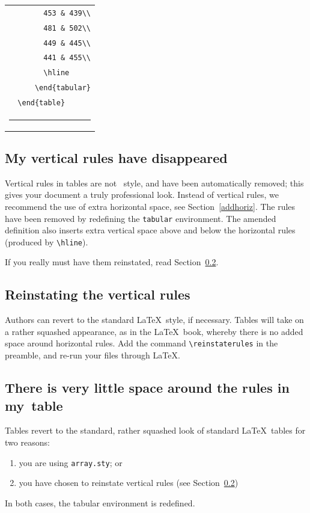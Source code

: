 \begin{table}
\begin{tabular}{@{}p{0pt}@{}}
      \verb"        453 & 439\\"\\
      \verb"        481 & 502\\"\\
      \verb"        449 & 445\\"\\
      \verb"        441 & 455\\"\\
      \verb"        \hline"\\
      \verb"      \end{tabular}"\\
      \verb"  \end{table}"\\
      \rule[2pt]{\textwidth}{0.5pt}\\
    \end{tabular}
  \end{table}

\subsection{My vertical rules have disappeared}

Vertical rules in tables are not \cambridge\ style, and have been automatically removed; this gives your document a truly professional look. Instead of vertical rules, we recommend the use of extra horizontal space, see Section~\ref{addhoriz}. The rules have been removed by redefining the \verb"tabular" environment. The amended definition also inserts extra vertical space above and below the horizontal rules (produced by \verb"\hline").

If you really must have them reinstated, read Section~\ref{reinstate}.

\subsection{Reinstating the vertical rules}
\label{reinstate}
Authors can revert to the standard \LaTeX\ style, if necessary. Tables will take on a rather squashed appearance, as in the \LaTeX\ book, whereby there is no added space around horizontal rules. Add the command \verb"\reinstaterules" in the preamble, and re-run your files through \LaTeX.

\subsection{There is very little space around the rules in my~table}
Tables revert to the standard, rather squashed look of standard \LaTeX\ tables for two reasons:
\begin{enumerate}
  \item you are using \verb"array.sty"; or
  \item you have chosen to reinstate vertical rules (see Section~\ref{reinstate})
\end{enumerate}
In both cases, the tabular environment is redefined.


